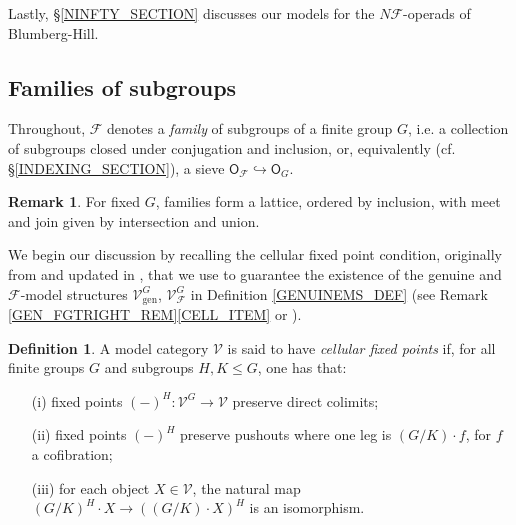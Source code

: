 \documentclass[a4paper,10pt
,draft
]{article}%
\numberwithin{equation}{section}
\numberwithin{figure}{section}
\theoremstyle{definition} %
\newtheorem{definition}[equation]{Definition}%
\newtheorem{remark}[equation]{Remark}%
\newcommand{\1}{\ensuremath{\mathbbm 1}}%
\begin{document}
Lastly, \S \ref{NINFTY_SECTION} discusses our models for the 
$N \mathcal{F}$-operads of Blumberg-Hill.

\subsection{Families of subgroups}
\label{FAMILY_SEC}

Throughout,
$\mathcal{F}$ denotes a \textit{family} of subgroups of a finite group $G$,
i.e. a collection of subgroups closed under conjugation and inclusion, or, equivalently
(cf. \S \ref{INDEXING_SECTION}),
a sieve 
$
\mathsf{O}_{\mathcal{F}}
	\hookrightarrow 
\mathsf{O}_G
$.

\begin{remark}
For fixed $G$, families form a lattice, ordered by inclusion, 
with meet and join given by intersection and union.
\end{remark}


We begin our discussion by recalling
the cellular fixed point condition,
originally from \cite{Gui06} and updated in \cite{Ste16},
that we use to guarantee the existence
of the genuine and $\mathcal{F}$-model structures
$\mathcal{V}^G_{\text{gen}}$,
$\mathcal{V}^G_{\mathcal{F}}$
in Definition \ref{GENUINEMS_DEF}
(see Remark \ref{GEN_FGTRIGHT_REM}\ref{CELL_ITEM} or \cite[Prop. 2.6]{Ste16}).


\begin{definition}\label{CELL DEF}
	A model category $\mathcal{V}$ is said to have 
	\textit{cellular fixed points} if,
	for all finite groups $G$ and subgroups $H,K\leq G$,
	one has that:
\begin{itemize}
	\item[(i)] fixed points $(\minus)^H \colon \mathcal{V}^G \to \mathcal{V}$ preserve direct colimits;
	\item[(ii)] fixed points $(\minus)^H$ preserve pushouts where one leg is $(G/K)\cdot f$, for $f$ a cofibration;
	\item[(iii)] for each object $X \in \mathcal{V}$, the natural map 
	$(G/K)^H \cdot X \to ((G/K) \cdot X)^H$
	is an isomorphism.
\end{itemize}
\end{definition}
\end{document}
